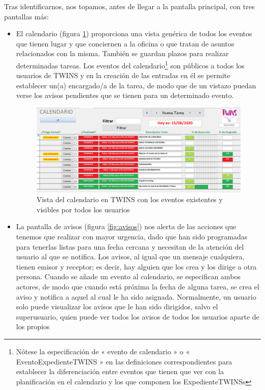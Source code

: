 Tras identificarnos, nos topamos, antes de llegar a la pantalla principal, con tres pantallas más:

\begin{itemize}
	\item El calendario (figura \ref{fig:calendario}) proporciona una vista genérica de todos los eventos que tienen lugar y que conciernen a la oficina o que tratan de asuntos relacionados con la misma. También se guardan plazos para realizar determinadas tareas. Los eventos del calendario\footnote{Nótese la especificación de « evento de calendario » o « \gls{EventoExpedienteTWINS} » en las definiciones correspondientes para establecer la diferenciación entre eventos que tienen que ver con la planificación en el calendario y los que componen los \glspl{ExpedienteTWINS}} son públicos a todos los usuarios de TWINS y en la creación de las entradas en él se permite establecer un(a) encargado/a de la tarea, de modo que de un vistazo puedan verse los avisos pendientes que se tienen para un determinado evento.
	
	\begin{figure}
		\includegraphics[width=\textwidth]{img/Capturas de TWINS/calendario.png}
		\caption[Calendario de TWINS]{Vista del calendario en TWINS con los eventos existentes y visibles por todos los usuarios}
		\label{fig:calendario}
	\end{figure}
	
	
	\item La pantalla de avisos (figura \ref{fig:avisos}) nos alerta de las acciones que tenemos que realizar con mayor urgencia, dado que han sido programadas para tenerlas listas para una fecha cercana y necesitan de la atención del usuario al que se notifica. Los avisos, al igual que un mensaje cualquiera, tienen emisor y receptor; es decir, hay alguien que los crea y los dirige a otra persona. Cuando se añade un evento al calendario, se especifican ambos actores, de modo que cuando está próxima la fecha de alguna tarea, se crea el aviso y notifica a aquel al cual le ha sido asignada. Normalmente, un usuario solo puede visualizar los avisos que le han sido dirigidos, salvo el superusuario, quien puede ver todos los avisos de todos los usuarios aparte de los propios
	

\end{itemize}
